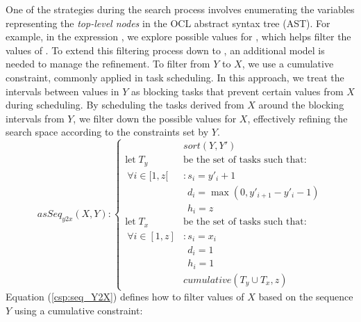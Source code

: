 One of the strategies during the search process involves enumerating the variables representing the \emph{top-level nodes} in the OCL abstract syntax tree (AST). For example, in the expression , we explore possible values for , which helps filter the values of . To extend this filtering process down to , an additional model is needed to manage the refinement.
To filter from $Y$ to $X$, we use a cumulative constraint, commonly applied in task scheduling. In this approach, we treat the intervals between values in $Y$ as blocking tasks that prevent certain values from $X$ during scheduling. 
By scheduling the tasks derived from $X$ around the blocking intervals from $Y$, we filter down the possible values for $X$, effectively refining the search space according to the constraints set by $Y$.
\begin{equation}\label{csp:seq_Y2X}
asSeq_{y2x}(X,Y):
\begin{cases}
&sort(Y,Y')\\
\text{let}\; T_y\; &\text{be the set of tasks such that:}\\
~\forall i \in [1,z[ &: s_i=y'_i+1\\
&\hspace{5pt} d_i=\max(0,y'_{i+1}-y'_i-1)\\
&\hspace{5pt}h_i=z\\
\text{let}\; T_x\; &\text{be the set of tasks such that:}\\
~\forall i \in [1,z] &: s_i=x_i\\
&~~d_i=1\\
&~~h_i=1\\
&cumulative(T_y\cup T_x,z)
\end{cases}
\end{equation}
Equation (\ref{csp:seq_Y2X}) defines how to filter values of $X$ based on the sequence $Y$ using a cumulative constraint:
